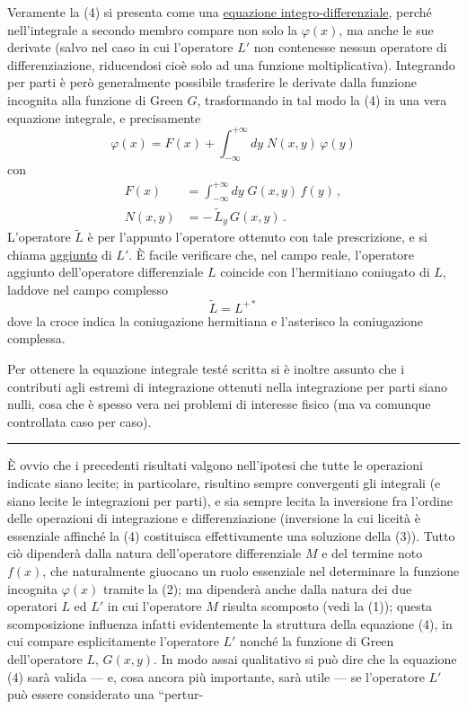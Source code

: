 \documentclass[11pt, a4paper]{book}
\numberwithin{equation}{section}
\begin{document}
Veramente la (4) si presenta come una \underline{equazione integro-differenziale}, perché nell'integrale a secondo membro compare non solo la $\varphi(x)$, ma anche le sue derivate (salvo nel caso in cui l'operatore $L'$ non contenesse nessun operatore di differenziazione, riducendosi cioè solo ad una funzione moltiplicativa). Integrando per parti è però generalmente possibile trasferire le derivate dalla funzione incognita alla funzione di Green $G$, trasformando in tal modo la (4) in una vera equazione integrale, e precisamente
\begin{equation*}
\varphi(x) = F(x) + \int_{-\infty}^{+\infty} dy\; N(x,y)\,\varphi(y)
\end{equation*}
con
\begin{align*}
F(x) &= \int_{-\infty}^{+\infty} dy\; G(x,y)\,f(y)\,, \\
N(x,y) &= -\,\widetilde{L}_y\,G(x,y)\,.
\end{align*}
L'operatore $\widetilde{L}$ è per l'appunto l'operatore ottenuto con tale prescrizione, e si chiama \underline{aggiunto} di $L'$. È facile verificare che, nel campo reale, l'operatore aggiunto dell'operatore differenziale $L$ coincide con l'hermitiano coniugato di $L$, laddove nel campo complesso
\begin{equation*}
\widetilde{L} = L^{+*}
\end{equation*}
dove la croce indica la coniugazione hermitiana e l'asterisco la coniugazione complessa.

Per ottenere la equazione integrale testé scritta si è inoltre assunto che i contributi agli estremi di integrazione ottenuti nella integrazione per parti siano nulli, cosa che è spesso vera nei problemi di interesse fisico (ma va comunque controllata caso per caso).

\noindent\rule{\linewidth}{0.4pt}

È ovvio che i precedenti risultati valgono nell'ipotesi che tutte le operazioni indicate siano lecite; in particolare, risultino sempre convergenti gli integrali (e siano lecite le integrazioni per parti), e sia sempre lecita la inversione fra l'ordine delle operazioni di integrazione e differenziazione (inversione la cui liceità è essenziale affinché la (4) costituisca effettivamente una soluzione della (3)). Tutto ciò dipenderà dalla natura dell'operatore differenziale $M$ e del termine noto $f(x)$, che naturalmente giuocano un ruolo essenziale nel determinare la funzione incognita $\varphi(x)$ tramite la (2); ma dipenderà anche dalla natura dei due operatori $L$ ed $L'$ in cui l'operatore $M$ risulta scomposto (vedi la (1)); questa scomposizione influenza infatti evidentemente la struttura della equazione (4), in cui compare esplicitamente l'operatore $L'$ nonché la funzione di Green dell'operatore $L$, $G(x,y)$. In modo assai qualitativo si può dire che la equazione (4) sarà valida --- e, cosa ancora più importante, sarà utile --- se l'operatore $L'$ può essere considerato una ``pertur-
\end{document}
